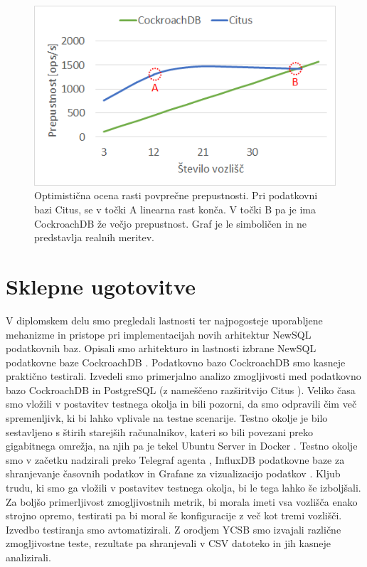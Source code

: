 \documentclass[a4paper, 12pt]{book}
\begin{document}
\begin{figure}[H]
\begin{center}
\includegraphics[width=1\textwidth]{resources/scaling-throughput-prediction-v2.png}
\end{center}
\caption{Optimistična ocena rasti povprečne prepustnosti. Pri podatkovni bazi Citus, se v točki A linearna rast konča. V točki B pa je ima CockroachDB že večjo prepustnost. Graf je le simboličen in ne predstavlja realnih meritev.}
\label{img_ycsb_results_scaling_throughptu_prediction}
\end{figure}


\chapter{Sklepne ugotovitve}

V diplomskem delu smo pregledali lastnosti  ter najpogosteje uporabljene mehanizme in pristope pri implementacijah novih arhitektur NewSQL podatkovnih baz. Opisali smo arhitekturo in lastnosti izbrane NewSQL podatkovne baze CockroachDB \cite{CRDB-home}. Podatkovno bazo CockroachDB smo kasneje praktično testirali. Izvedeli smo primerjalno analizo zmogljivosti med podatkovno bazo CockroachDB in PostgreSQL \cite{postgres} (z nameščeno razširitvijo Citus \cite{citus}). Veliko časa smo vložili v postavitev testnega okolja in bili pozorni, da smo odpravili čim več spremenljivk, ki bi lahko vplivale na testne scenarije. Testno okolje je bilo sestavljeno s štirih starejših računalnikov, kateri so bili povezani preko gigabitnega omrežja, na njih pa je tekel Ubuntu Server \cite{ubuntu-server} in Docker \cite{docker}. Testno okolje smo v začetku nadzirali preko Telegraf agenta \cite{telegraf}, InfluxDB podatkovne baze za shranjevanje časovnih podatkov \cite{influxdb} in Grafane za vizualizacijo podatkov \cite{grafana}. Kljub trudu, ki smo ga vložili v postavitev testnega okolja, bi le tega lahko še izboljšali. Za boljšo primerljivost zmogljivostnih metrik, bi morala imeti vsa vozlišča enako strojno opremo, testirati pa bi moral še konfiguracije z več kot tremi vozlišči. Izvedbo testiranja smo avtomatizirali. Z orodjem YCSB \cite{brianfrankcooper/YCSB} smo izvajali različne zmogljivostne teste, rezultate pa shranjevali v CSV datoteko in jih kasneje analizirali.
\end{document}
